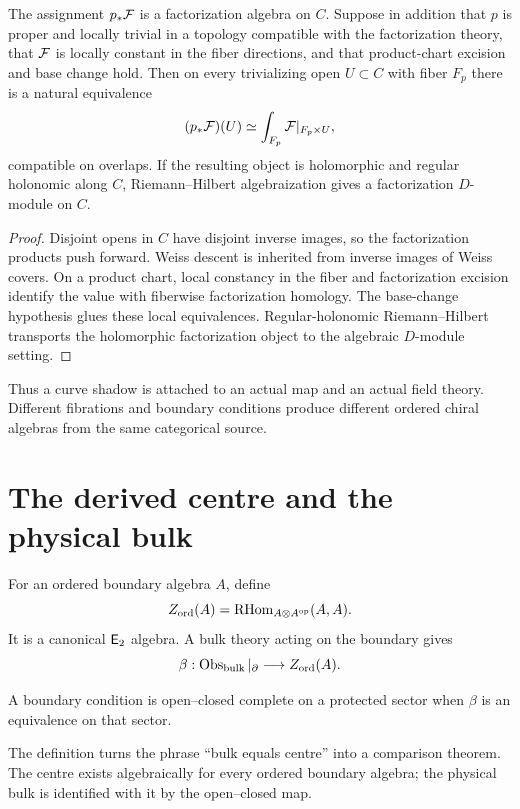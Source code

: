 \begin{theorem}
The assignment $p_*\mathcal F$ is a factorization algebra on $C$. Suppose in addition that $p$ is proper and locally trivial in a topology compatible with the factorization theory, that $\mathcal F$ is locally constant in the fiber directions, and that product-chart excision and base change hold. Then on every trivializing open $U\subset C$ with fiber $F_p$ there is a natural equivalence
\[
 (p_*\mathcal F)(U)\simeq
 \int_{F_p}\mathcal F|_{F_p\times U},
\]
compatible on overlaps. If the resulting object is holomorphic and regular holonomic along $C$, Riemann--Hilbert algebraization gives a factorization $D$-module on $C$.
\end{theorem}
\begin{proof}
Disjoint opens in $C$ have disjoint inverse images, so the factorization products push forward. Weiss descent is inherited from inverse images of Weiss covers. On a product chart, local constancy in the fiber and factorization excision identify the value with fiberwise factorization homology. The base-change hypothesis glues these local equivalences. Regular-holonomic Riemann--Hilbert transports the holomorphic factorization object to the algebraic $D$-module setting.
\end{proof}

Thus a curve shadow is attached to an actual map and an actual field theory. Different fibrations and boundary conditions produce different ordered chiral algebras from the same categorical source.

\chapter{The derived centre and the physical bulk}
For an ordered boundary algebra $A$, define
\[
 Z_{\mathrm{ord}}(A)=\operatorname{RHom}_{A\otimes A^{\mathrm{op}}}(A,A).
\]
It is a canonical $\mathsf E_2$ algebra. A bulk theory acting on the boundary gives
\[
 \beta:\operatorname{Obs}_{\mathrm{bulk}}|_{\partial}\longrightarrow Z_{\mathrm{ord}}(A).
\]

\begin{definition}
A boundary condition is open--closed complete on a protected sector when $\beta$ is an equivalence on that sector.
\end{definition}

The definition turns the phrase ``bulk equals centre'' into a comparison theorem. The centre exists algebraically for every ordered boundary algebra; the physical bulk is identified with it by the open--closed map.

